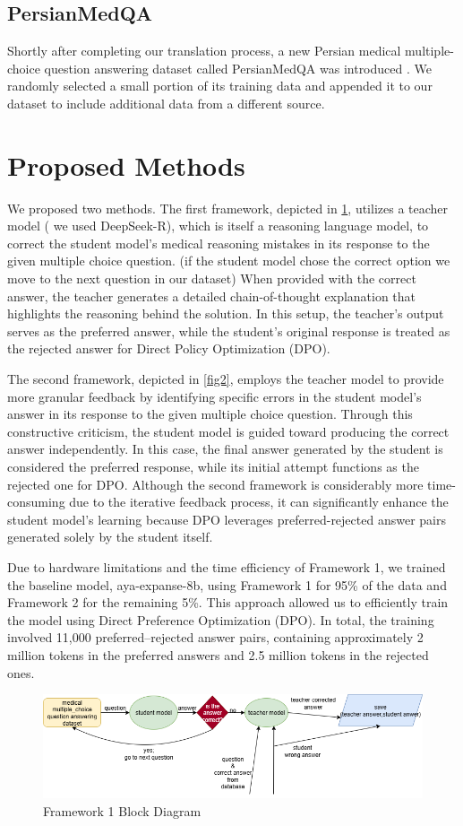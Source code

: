 \documentclass[conference]{IEEEtran}
\begin{document}
         \subsection{PersianMedQA}
Shortly after completing our translation process, a new Persian medical multiple-choice question answering dataset called PersianMedQA was introduced
\cite{b24}
. We randomly selected a small portion of its training data and appended it to our dataset to include additional data from a different source.
          \section{Proposed Methods}
We proposed two methods. The first framework, depicted in \ref{fig1}, utilizes a teacher model ( we used DeepSeek-R), which is itself a reasoning language model, to correct the student model’s medical reasoning mistakes in its response to the given multiple choice question.
 (if the student model chose the correct option we move to the next question in our dataset)
When provided with the correct answer, the teacher generates a detailed chain-of-thought explanation that highlights the reasoning behind the solution. In this setup, the teacher’s output serves as the preferred answer, while the student’s original response is treated as the rejected answer for Direct Policy Optimization (DPO).

 The second framework, depicted in \ref{fig2}, employs the teacher model to provide more granular feedback by identifying specific errors in the student model’s answer in its response to the given multiple choice question. Through this constructive criticism, the student model is guided toward producing the correct answer independently. In this case, the final answer generated by the student is considered the preferred response, while its initial attempt functions as the rejected one for DPO. Although the second framework is considerably more time-consuming due to the iterative feedback process, it can significantly enhance the student model’s learning because DPO leverages preferred-rejected answer pairs generated solely by the student itself.

Due to hardware limitations and the time efficiency of Framework 1, we trained the baseline model, aya-expanse-8b, using Framework 1 for 95\% of the data and Framework 2 for the remaining 5\%. This approach allowed us to efficiently train the model using Direct Preference Optimization (DPO). In total, the training involved 11,000 preferred–rejected answer pairs, containing approximately 2 million tokens in the preferred answers and 2.5 million tokens in the rejected ones.
\begin{figure}[h]
    \centering
    \includegraphics[width=1.0\linewidth]{fig1.png}
    \caption{Framework 1 Block Diagram}
    \label{fig1}
\end{figure}
\end{document}
